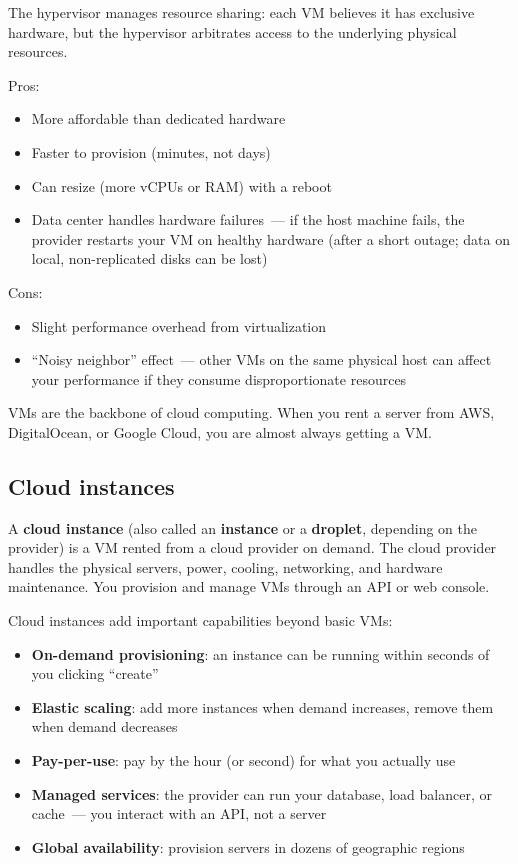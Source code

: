 \noindent{}The hypervisor manages resource sharing: each VM believes it has exclusive hardware, but the hypervisor arbitrates access to the underlying physical resources.

Pros:

\begin{itemize}
\tightlist
\item
  More affordable than dedicated hardware
\item
  Faster to provision (minutes, not days)
\item
  Can resize (more vCPUs or RAM) with a reboot
\item
  Data center handles hardware failures~--- if the host machine fails, the provider restarts your VM on healthy hardware (after a short outage; data on local, non-replicated disks can be lost)
\end{itemize}

\noindent{}Cons:

\begin{itemize}
\tightlist
\item
  Slight performance overhead from virtualization
\item
  ``Noisy neighbor'' effect~--- other VMs on the same physical host can affect your performance if they consume disproportionate resources
\end{itemize}

\noindent{}VMs are the backbone of cloud computing. When you rent a server from AWS, DigitalOcean, or Google Cloud, you are almost always getting a VM.

\subsection*{Cloud instances}\label{20-server-fundamentals:cloud-instances}

A \textbf{cloud instance} (also called an \textbf{instance} or a \textbf{droplet}, depending on the provider) is a VM rented from a cloud provider on demand. The cloud provider handles the physical servers, power, cooling, networking, and hardware maintenance. You provision and manage VMs through an API or web console.

Cloud instances add important capabilities beyond basic VMs:

\begin{itemize}
\tightlist
\item
  \textbf{On-demand provisioning}: an instance can be running within seconds of you clicking ``create''
\item
  \textbf{Elastic scaling}: add more instances when demand increases, remove them when demand decreases
\item
  \textbf{Pay-per-use}: pay by the hour (or second) for what you actually use
\item
  \textbf{Managed services}: the provider can run your database, load balancer, or cache~--- you interact with an API, not a server
\item
  \textbf{Global availability}: provision servers in dozens of geographic regions
\end{itemize}

